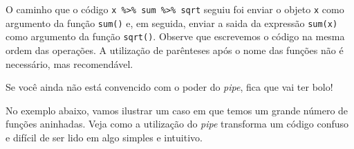 \documentclass[
]{book}
\newenvironment{Shaded}{\begin{snugshade}}{\end{snugshade}}
\newcommand{\CommentTok}[1]{\textcolor[rgb]{0.56,0.35,0.01}{\textit{#1}}}
\newcommand{\DecValTok}[1]{\textcolor[rgb]{0.00,0.00,0.81}{#1}}
\newcommand{\KeywordTok}[1]{\textcolor[rgb]{0.13,0.29,0.53}{\textbf{#1}}}
\newcommand{\NormalTok}[1]{#1}
\newcommand{\OperatorTok}[1]{\textcolor[rgb]{0.81,0.36,0.00}{\textbf{#1}}}
\newcommand{\StringTok}[1]{\textcolor[rgb]{0.31,0.60,0.02}{#1}}
\begin{document}
\begin{Shaded}
\end{Shaded}

O caminho que o código \texttt{x\ \%\textgreater{}\%\ sum\ \%\textgreater{}\%\ sqrt} seguiu foi enviar o objeto \texttt{x} como argumento da função \texttt{sum()} e, em seguida, enviar a saida da expressão \texttt{sum(x)} como argumento da função \texttt{sqrt()}. Observe que escrevemos o código na mesma ordem das operações. A utilização de parênteses após o nome das funções não é necessário, mas recomendável.

Se você ainda não está convencido com o poder do \emph{pipe}, fica que vai ter bolo!

No exemplo abaixo, vamos ilustrar um caso em que temos um grande número de funções aninhadas. Veja como a utilização do \emph{pipe} transforma um código confuso e difícil de ser lido em algo simples e intuitivo.
\end{document}
